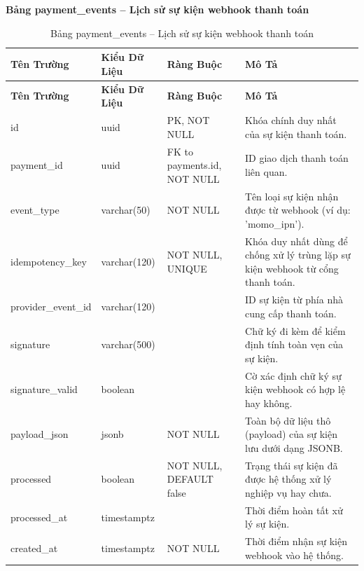 \textbf{Bảng payment\_events -- Lịch sử sự kiện webhook thanh toán}
\label{table:payment_events}
\begin{longtable}{|p{3cm}|p{2.5cm}|p{3.5cm}|p{5cm}|}
\caption{Bảng payment\_events -- Lịch sử sự kiện webhook thanh toán} \\
\hline
\textbf{Tên Trường} & \textbf{Kiểu Dữ Liệu} & \textbf{Ràng Buộc} & \textbf{Mô Tả} \\
\hline
\endfirsthead
\hline
\textbf{Tên Trường} & \textbf{Kiểu Dữ Liệu} & \textbf{Ràng Buộc} & \textbf{Mô Tả} \\
\hline
\endhead
id & uuid & PK, NOT NULL & Khóa chính duy nhất của sự kiện thanh toán. \\
\hline
payment\_id & uuid & FK to payments.id, NOT NULL & ID giao dịch thanh toán liên quan. \\
\hline
event\_type & varchar(50) & NOT NULL & Tên loại sự kiện nhận được từ webhook (ví dụ: 'momo\_ipn'). \\
\hline
idempotency\_key & varchar(120) & NOT NULL, UNIQUE & Khóa duy nhất dùng để chống xử lý trùng lặp sự kiện webhook từ cổng thanh toán. \\
\hline
provider\_event\_id & varchar(120) & & ID sự kiện từ phía nhà cung cấp thanh toán. \\
\hline
signature & varchar(500) & & Chữ ký đi kèm để kiểm định tính toàn vẹn của sự kiện. \\
\hline
signature\_valid & boolean & & Cờ xác định chữ ký sự kiện webhook có hợp lệ hay không. \\
\hline
payload\_json & jsonb & NOT NULL & Toàn bộ dữ liệu thô (payload) của sự kiện lưu dưới dạng JSONB. \\
\hline
processed & boolean & NOT NULL, DEFAULT false & Trạng thái sự kiện đã được hệ thống xử lý nghiệp vụ hay chưa. \\
\hline
processed\_at & timestamptz & & Thời điểm hoàn tất xử lý sự kiện. \\
\hline
created\_at & timestamptz & NOT NULL & Thời điểm nhận sự kiện webhook vào hệ thống. \\
\end{longtable}

